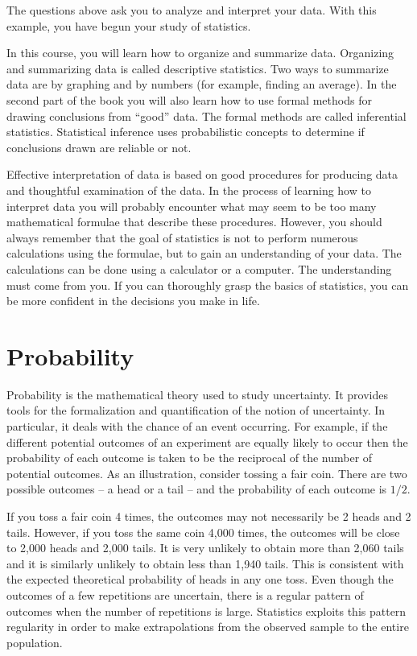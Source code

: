 \documentclass[]{krantz}
\theoremstyle{definition}
\theoremstyle{definition}
\theoremstyle{definition}
\theoremstyle{remark}
\begin{document}
The questions above ask you to analyze and interpret your data. With
this example, you have begun your study of statistics.

In this course, you will learn how to organize and summarize data.
Organizing and summarizing data is called descriptive statistics. Two
ways to summarize data are by graphing and by numbers (for example,
finding an average). In the second part of the book you will also learn
how to use formal methods for drawing conclusions from ``good'' data. The
formal methods are called inferential statistics. Statistical inference
uses probabilistic concepts to determine if conclusions drawn are
reliable or not.

Effective interpretation of data is based on good procedures for
producing data and thoughtful examination of the data. In the process of
learning how to interpret data you will probably encounter what may seem
to be too many mathematical formulae that describe these procedures.
However, you should always remember that the goal of statistics is not
to perform numerous calculations using the formulae, but to gain an
understanding of your data. The calculations can be done using a
calculator or a computer. The understanding must come from you. If you
can thoroughly grasp the basics of statistics, you can be more confident
in the decisions you make in life.

\hypertarget{probability}{%
\section{Probability}\label{probability}}

Probability is the mathematical theory used to study uncertainty. It
provides tools for the formalization and quantification of the notion of
uncertainty. In particular, it deals with the chance of an event
occurring. For example, if the different potential outcomes of an
experiment are equally likely to occur then the probability of each
outcome is taken to be the reciprocal of the number of potential
outcomes. As an illustration, consider tossing a fair coin. There are
two possible outcomes -- a head or a tail -- and the probability of each
outcome is \(1/2\).

If you toss a fair coin 4 times, the outcomes may not necessarily be 2
heads and 2 tails. However, if you toss the same coin 4,000 times, the
outcomes will be close to 2,000 heads and 2,000 tails. It is very
unlikely to obtain more than 2,060 tails and it is similarly unlikely to
obtain less than 1,940 tails. This is consistent with the expected
theoretical probability of heads in any one toss. Even though the
outcomes of a few repetitions are uncertain, there is a regular pattern
of outcomes when the number of repetitions is large. Statistics exploits
this pattern regularity in order to make extrapolations from the
observed sample to the entire population.
\end{document}
